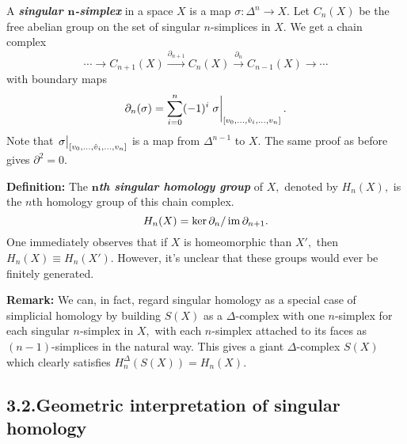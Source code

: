 \documentclass{article}
\begin{document}
\noindent{}A \textbf{\emph{singular $\bm{n}$-simplex}} in a space $X$ is a map $\sigma: \Delta^n \to X.$ Let $C_n(X)$ be the free abelian group on the set of singular $n$-simplices in $X.$ We get a chain complex%
\noindent\noindent\[%
\cdots \longrightarrow C_{n+1}(X)
\overset{\partial_{n+1}}{\longrightarrow} C_n(X)
\overset{\partial_{n}}{\longrightarrow} C_{n-1}(X)
\longrightarrow \cdots
\]%
\noindent{}with boundary maps
\noindent\noindent\[%
\partial_n(\sigma) = \sum_{i=0}^n (-1)^i
\eval{\sigma}_{[v_0, \dots, \hat{v}_i, \dots, v_n]}.
\]%
\noindent{}Note that $\eval{\sigma}_{[v_0, \dots, \hat{v}_i, \dots, v_n]}$ is a map from $\Delta^{n-1}$ to $X.$ The same proof as before gives $\partial^2 = 0.$

\textbf{Definition:} The \textbf{\emph{$\bm{n}$th singular homology group}} of $X,$ denoted by $H_n(X),$ is the $n$th homology group of this chain complex.%
\noindent\noindent\[%
H_n(X) = \ker \partial_n / \im \partial_{n+1}.
\]%
\noindent{}One immediately observes that if $X$ is homeomorphic than $X',$ then $H_n(X) \equiv H_n(X').$ However, it's unclear that these groups would ever be finitely generated.

\textbf{Remark:} We can, in fact, regard singular homology as a special case of simplicial homology by building $S(X)$ as a $\Delta$-complex with one $n$-simplex for each singular $n$-simplex in $X,$ with each $n$-simplex attached to its faces as $(n-1)$-simplices in the natural way. This gives a giant $\Delta$-complex $S(X)$ which clearly satisfies $H_n^\Delta(S(X)) = H_n(X).$%

\subsection{3.2.\hspace*{0.5em}Geometric interpretation of singular homology}\label{sec-geometric-interpretation-of-singular-homology}%
\end{document}
